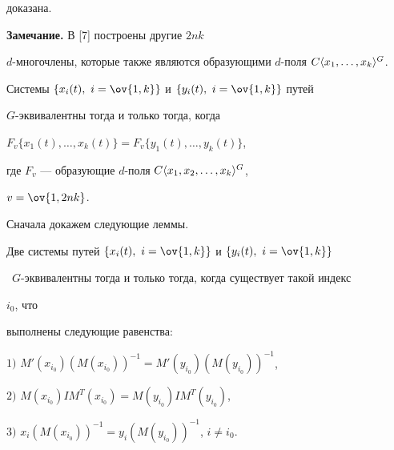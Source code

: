 доказана.


\medskip





{\bf Замечание.} В [7] построены другие $2nk$ \


$d$-многочлены, которые также являются образующими $d$-поля $C\la 


x_1,\dotsc,x_k\ra^G$.





\begin{thm}


Системы $\{x_i(t),\ i=\ov{1,k}\}$ и $\{y_i(t),\ i=\ov{1,k}\}$ путей


$G$-эквивалентны тогда и только тогда, когда


$F_v\{x_1(t),\dotsc,x_k(t)\}= F_v\{y_1(t),\dotsc,y_k(t)\}$,


где $F_v$ --- образующие $d$-поля $C\langle x_1,x_2,\dotsc,x_k\rangle^G$, 


$v=\ov{1,2nk}$.


\end{thm}





Сначала докажем следующие леммы.





\begin{lem}


Две системы путей $\{x_i(t), \ i=\ov{1,k}\}$ и $\{y_i(t), \ i=\ov{1,k}\}$


\ $G$-эквивалентны тогда и только тогда, когда существует такой индекс 


$i_0$, что 


выполнены следующие равенства$:$





$1)$ $M'(x_{i_0})(M(x_{i_0}))^{-1}=M'(y_{i_0})(M(y_{i_0}))^{-1}$,





$2)$ $M(x_{i_0})I M^T(x_{i_0})=M(y_{i_0})I M^T(y_{i_0})$,





$3)$ $x_i(M(x_{i_0}))^{-1}=y_i(M(y_{i_0}))^{-1}$, $i\ne i_0$.


\end{lem}





